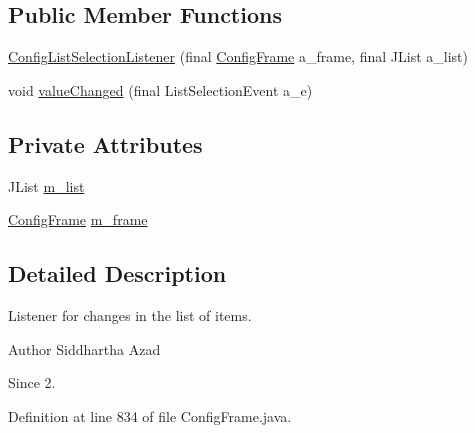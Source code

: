 \subsection*{Public Member Functions}
\begin{DoxyCompactItemize}
\item 
\hyperlink{classorg_1_1jgap_1_1gui_1_1_config_frame_1_1_config_list_selection_listener_a17e56c9bba9ef718d0ad9fce312ad244}{Config\-List\-Selection\-Listener} (final \hyperlink{classorg_1_1jgap_1_1gui_1_1_config_frame}{Config\-Frame} a\-\_\-frame, final J\-List a\-\_\-list)
\item 
void \hyperlink{classorg_1_1jgap_1_1gui_1_1_config_frame_1_1_config_list_selection_listener_a2c3fd1d9e8f8ef2d203a9ecfad0ca345}{value\-Changed} (final List\-Selection\-Event a\-\_\-e)
\end{DoxyCompactItemize}
\subsection*{Private Attributes}
\begin{DoxyCompactItemize}
\item 
J\-List \hyperlink{classorg_1_1jgap_1_1gui_1_1_config_frame_1_1_config_list_selection_listener_a0c7750e4cf92b8213a4e6835bd3d537f}{m\-\_\-list}
\item 
\hyperlink{classorg_1_1jgap_1_1gui_1_1_config_frame}{Config\-Frame} \hyperlink{classorg_1_1jgap_1_1gui_1_1_config_frame_1_1_config_list_selection_listener_ab913c485a320505f9c88addf2cb75495}{m\-\_\-frame}
\end{DoxyCompactItemize}


\subsection{Detailed Description}
Listener for changes in the list of items.

\begin{DoxyAuthor}{Author}
Siddhartha Azad 
\end{DoxyAuthor}
\begin{DoxySince}{Since}
2. 
\end{DoxySince}


Definition at line 834 of file Config\-Frame.\-java.



